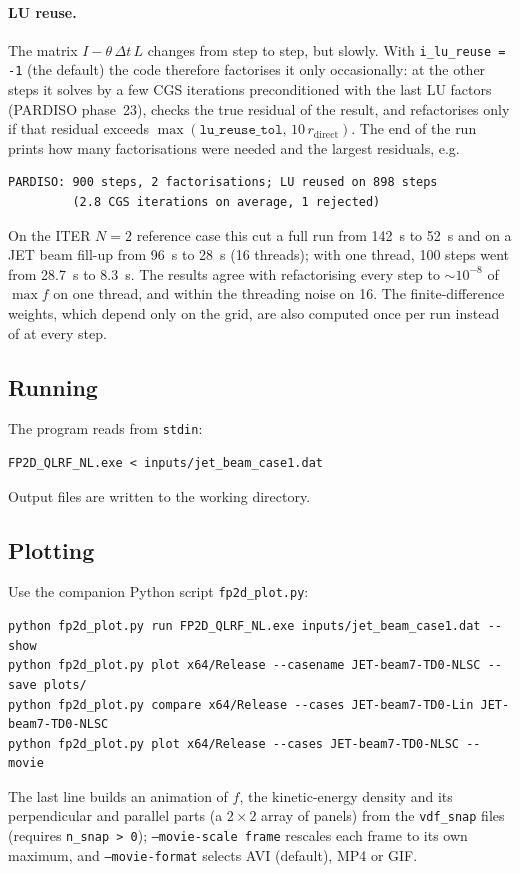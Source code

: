 \documentclass[11pt,a4paper]{article}
\begin{document}
\paragraph{LU reuse.}\label{sec:lureuse}  The matrix $I - \theta\,\Delta t\,L$
changes from step to step, but slowly.  With \texttt{i\_lu\_reuse = -1} (the
default) the code therefore factorises it only occasionally: at the other steps
it solves by a few CGS iterations preconditioned with the last LU factors
(PARDISO phase~23), checks the true residual of the result, and refactorises
only if that residual exceeds
$\max(\texttt{lu\_reuse\_tol},\,10\,r_\mathrm{direct})$.  The end of the run
prints how many factorisations were needed and the largest residuals, e.g.
\begin{lstlisting}
PARDISO: 900 steps, 2 factorisations; LU reused on 898 steps
         (2.8 CGS iterations on average, 1 rejected)
\end{lstlisting}
On the ITER $N=2$ reference case this cut a full run from 142~s to 52~s and on a
JET beam fill-up from 96~s to 28~s (16 threads); with one thread, 100 steps went
from 28.7~s to 8.3~s.  The results agree with refactorising every step to
${\sim}10^{-8}$ of $\max f$ on one thread, and within the threading noise on
16.  The finite-difference weights, which depend only on the grid, are also
computed once per run instead of at every step.

\subsection{Running}

The program reads from \texttt{stdin}:
\begin{lstlisting}
FP2D_QLRF_NL.exe < inputs/jet_beam_case1.dat
\end{lstlisting}
Output files are written to the working directory.

\subsection{Plotting}
\label{sec:plotting}

Use the companion Python script \texttt{fp2d\_plot.py}:
\begin{lstlisting}
python fp2d_plot.py run FP2D_QLRF_NL.exe inputs/jet_beam_case1.dat --show
python fp2d_plot.py plot x64/Release --casename JET-beam7-TD0-NLSC --save plots/
python fp2d_plot.py compare x64/Release --cases JET-beam7-TD0-Lin JET-beam7-TD0-NLSC
python fp2d_plot.py plot x64/Release --cases JET-beam7-TD0-NLSC --movie
\end{lstlisting}
The last line builds an animation of $f$, the kinetic-energy density and its
perpendicular and parallel parts (a $2\times2$ array of panels) from the \texttt{vdf\_snap} files (requires \texttt{n\_snap > 0}); \texttt{--movie-scale
frame} rescales each frame to its own maximum, and \texttt{--movie-format}
selects AVI (default), MP4 or GIF.
\end{document}
